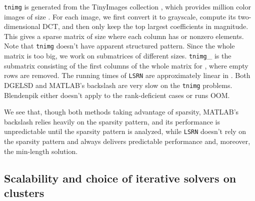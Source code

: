 \documentclass{siamltex}
\begin{document}
\texttt{tnimg} is generated from the TinyImages collection
\cite{torralba2008tiny}, which provides  million color images of size . For each image, we first convert it to grayscale, compute its
two-dimensional DCT, and then only keep the top  largest coefficients in
magnitude. This gives a sparse matrix of size  where
each column has  or  nonzero elements. Note that \texttt{tnimg} doesn't
have apparent structured pattern. Since the whole matrix is too big, we work on
submatrices of different sizes. \texttt{tnimg}\_ is the submatrix consisting
of the first  columns of the whole matrix for ,
where empty rows are removed. The running times of \texttt{LSRN} are
approximately linear in . Both DGELSD and MATLAB's backslash are very slow on
the \texttt{tnimg} problems. Blendenpik either doesn't apply to the
rank-deficient cases or runs OOM.

We see that, though both methods taking advantage of sparsity, MATLAB's
backslash relies heavily on the sparsity pattern, and its performance is
unpredictable until the sparsity pattern is analyzed, while \texttt{LSRN}
doesn't rely on the sparsity pattern and always delivers predictable performance
and, moreover, the min-length solution.

\subsection{Scalability and choice of iterative solvers on clusters}
\label{sec:scalability}
\end{document}
